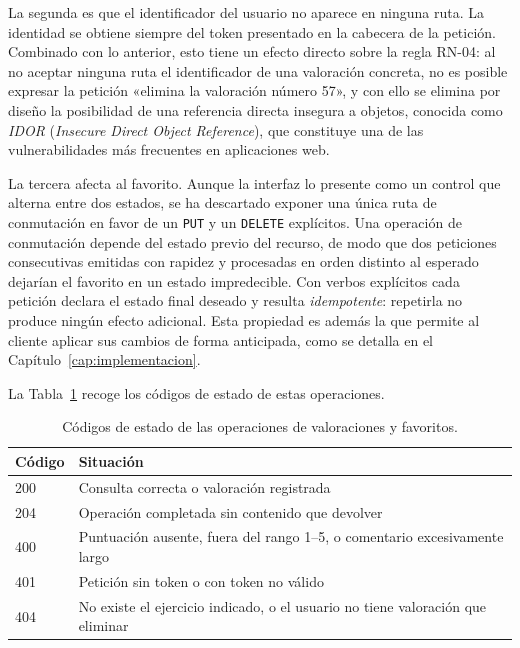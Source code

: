 \documentclass[12pt,a4paper,twoside,openright]{book}
\begin{document}
    La segunda es que el identificador del usuario no aparece en ninguna ruta.
    La identidad se obtiene siempre del token presentado en la cabecera de la
    petición. Combinado con lo anterior, esto tiene un efecto directo sobre la
    regla RN-04: al no aceptar ninguna ruta el identificador de una valoración
    concreta, no es posible expresar la petición «elimina la valoración número
    57», y con ello se elimina por diseño la posibilidad de una referencia
    directa insegura a objetos, conocida como \textit{IDOR}
    (\textit{Insecure Direct Object Reference}), que constituye una de las
    vulnerabilidades más frecuentes en aplicaciones web.

    La tercera afecta al favorito. Aunque la interfaz lo presente como un
    control que alterna entre dos estados, se ha descartado exponer una única
    ruta de conmutación en favor de un \texttt{PUT} y un \texttt{DELETE}
    explícitos. Una operación de conmutación depende del estado previo del
    recurso, de modo que dos peticiones consecutivas emitidas con rapidez y
    procesadas en orden distinto al esperado dejarían el favorito en un estado
    impredecible. Con verbos explícitos cada petición declara el estado final
    deseado y resulta \textit{idempotente}: repetirla no produce ningún efecto
    adicional. Esta propiedad es además la que permite al cliente aplicar sus
    cambios de forma anticipada, como se detalla en el
    Capítulo~\ref{cap:implementacion}.

    La Tabla~\ref{tab:api-social-codigos} recoge los códigos de estado de estas
    operaciones.

    \begin{table}[htbp]
        \centering
        \begin{tabular}{l p{9cm}}
            \toprule
            \textbf{Código} & \textbf{Situación} \\
            \midrule
            200 & Consulta correcta o valoración registrada \\
            204 & Operación completada sin contenido que devolver \\
            400 & Puntuación ausente, fuera del rango 1--5, o comentario excesivamente largo \\
            401 & Petición sin token o con token no válido \\
            404 & No existe el ejercicio indicado, o el usuario no tiene valoración que eliminar \\
            \bottomrule
        \end{tabular}
        \caption{Códigos de estado de las operaciones de valoraciones y
        favoritos.}
        \label{tab:api-social-codigos}
    \end{table}
\end{document}
